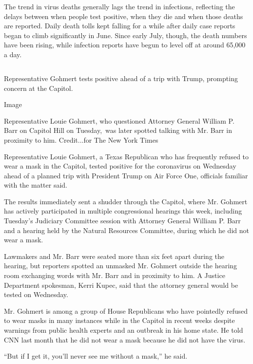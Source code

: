 The trend in virus deaths generally lags the trend in infections,
reflecting the delays between when people test positive, when they die
and when those deaths are reported. Daily death tolls kept falling for a
while after daily case reports began to climb significantly in June.
Since early July, though, the death numbers have been rising, while
infection reports have begun to level off at around 65,000 a day.

\hypertarget{-1}{%
\subsection{}\label{-1}}

Representative Gohmert tests positive ahead of a trip with Trump,
prompting concern at the Capitol.

Image

Representative Louie Gohmert, who questioned Attorney General William P.
Barr on Capitol Hill on Tuesday,~was later spotted talking with Mr. Barr
in proximity to him. Credit...for The New York Times

Representative Louie Gohmert, a Texas Republican who has frequently
refused to wear a mask in the Capitol, tested positive for the
coronavirus on Wednesday ahead of a planned trip with President Trump on
Air Force One, officials familiar with the matter said.

The results immediately sent a shudder through the Capitol, where Mr.
Gohmert has actively participated in multiple congressional hearings
this week, including Tuesday's Judiciary Committee session with Attorney
General William P. Barr and a hearing held by the Natural Resources
Committee, during which he did not wear a mask.

Lawmakers and Mr. Barr were seated more than six feet apart during the
hearing, but reporters spotted an unmasked Mr. Gohmert outside the
hearing room exchanging words with Mr. Barr and in proximity to him. A
Justice Department spokesman, Kerri Kupec, said that the attorney
general would be tested on Wednesday.

Mr. Gohmert is among a group of House Republicans who have pointedly
refused to wear masks in many instances while in the Capitol in recent
weeks despite warnings from public health experts and an outbreak in his
home state. He told CNN last month that he did not wear a mask because
he did not have the virus.

``But if I get it, you'll never see me without a mask,'' he said.

